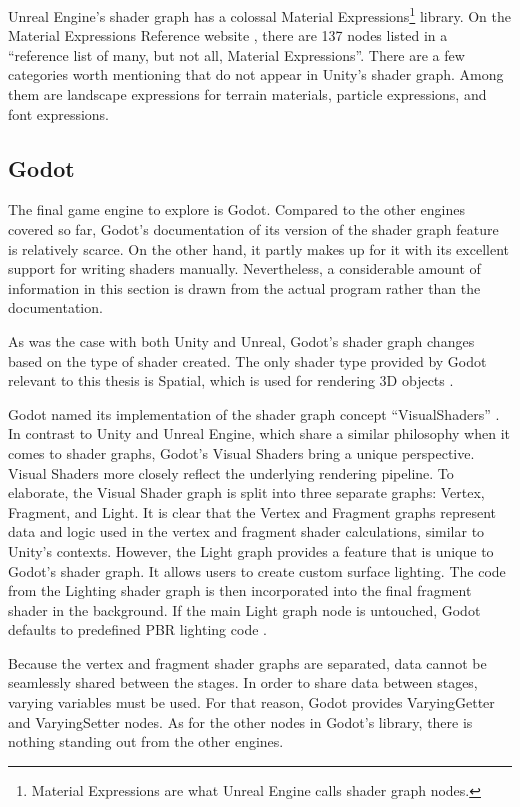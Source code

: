\documentclass[
  digital,     %
  oneside,     %
  nosansbold,  %
  nocolorbold, %
  lof,         %
  lot,         %
]{fithesis4}
\begin{document}
Unreal Engine's shader graph has a colossal Material Expressions\footnote{Material Expressions are what Unreal Engine
calls shader graph nodes.} library. On the Material Expressions Reference website
\cite{ue-expr-reference}, there are 137 nodes listed in a \enquote{reference list of many, but not all, Material Expressions}.
There are a few categories worth mentioning that do not appear in Unity's shader graph. Among them are landscape expressions
for terrain materials, particle expressions, and font expressions.

\subsection{Godot}
The final game engine to explore is Godot. Compared to the other engines covered so far, Godot's documentation
of its version of the shader graph feature is relatively scarce. On the other hand, it partly makes up for it
with its excellent support for writing shaders manually. Nevertheless, a considerable amount of information in this section
is drawn from the actual program rather than the documentation.

As was the case with both Unity and Unreal, Godot's shader graph changes based on the type of shader created.
The only shader type provided by Godot relevant to this thesis is Spatial, which is used for rendering 3D objects
\cite{godot-spatial-shaders}.

Godot named its implementation of the shader graph concept \enquote{VisualShaders} \cite{godot-visual-shaders}.
In contrast to Unity and Unreal Engine, which share a similar philosophy when it comes to shader graphs,
Godot's Visual Shaders bring a unique perspective. Visual Shaders more closely reflect the underlying
rendering pipeline. To elaborate, the Visual Shader graph is split into three separate graphs:
Vertex, Fragment, and Light. It is clear that the Vertex and Fragment graphs represent data and logic used in the vertex
and fragment shader calculations, similar to Unity's contexts.
However, the Light graph provides a feature that is unique to Godot's shader graph.
It allows users to create custom surface lighting. The code from the Lighting shader graph is then incorporated
into the final fragment shader in the background. If the main Light graph node is untouched,
Godot defaults to predefined PBR lighting code \cite{godot-shaders-intro}.

Because the vertex and fragment shader graphs are separated, data cannot be seamlessly shared between the stages.
In order to share data between stages, varying variables must be used. For that reason, Godot provides
VaryingGetter and VaryingSetter nodes. As for the other nodes in Godot's library, there is nothing standing
out from the other engines.
\end{document}
